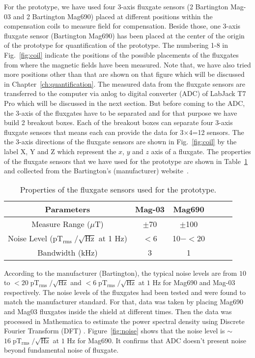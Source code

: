 For the prototype, we have used four 3-axis fluxgate sensors (2 Bartington Mag-03 and 2 Bartington Mag690) placed at different positions within the compensation coils to measure field for compensation. Beside those, one 3-axis fluxgate sensor (Bartington Mag690) has been placed at the center of the origin of the prototype for quantification of the prototype. The numbering 1-8 in Fig.~\ref{fig:coil} indicate the positions of the possible placements of the fluxgates from where the magnetic fields have been measured. Note that, we have also tried more positions other than that are shown on that figure which will be discussed in Chapter~\ref{ch:quantification}.  The measured data from the fluxgate sensors are transferred to the computer via anlog to digital converter (ADC) of LabJack T7 Pro which will be discussed in the next section. But before coming to the ADC, the 3-axis of the fluxgates have to be separated and for that purpose we have build  2 breakout boxes. Each of the breakout boxes can separate four 3-axis fluxgate sensors that means each can provide the data for 3$\times$4=12 sensors. The the 3-axis directions of the fluxgate sensors are shown in Fig.~\ref{fig:coil} by the label X, Y and Z which represent the $x$, $y$ and $z$ axis of a fluxgate.  The properties of the fluxgate sensors that we have used for the prototype are shown in Table~\ref{tablE:sensor} and collected from the Bartington's (manufacturer) website~\cite{flux}. 

\begin{table} [!htb]
    \centering
    \begin{tabular} { |c|c|c|c|c|c|} 
        \hline
        Parameters & Mag-03 & Mag690 \\
        \hline\hline
        Measure Range ($\mu$T) & $\pm$70 & $\pm$100 \\ 
        \hline
        \makecell{Noise Level \\($\mathrm{pT_{rms}\;/\sqrt{Hz}}$ at 1 Hz)} & $<$6 & 10$-<$20 \\ 
        \hline
        Bandwidth (kHz) & 3 & 1 \\ 
        \hline

    \end{tabular}
    \caption{Properties of the fluxgate sensors used for the prototype.}\label{tablE:sensor}
\end{table}

According to the manufacturer (Bartington), the typical noise levels are from $\mathrm{10}$ to $\mathrm{<20\;pT_{rms}\;/\sqrt{Hz}}$ and $\mathrm{<6 \; pT_{rms} \;/\sqrt{Hz}}$ at $\mathrm{1}$ Hz for Mag690 and Mag-03 respectively. The noise levels of the fluxgates had been tested  and were found to match the manufacturer standard. For that, data was taken by placing Mag690 and Mag03 fluxgates inside the shield at different times. Then the data was processed in Mathematica \cite{Mathematica} to estimate the power spectral density using Discrete Fourier Transform (DFT) \cite{dft}. Figure~\ref{fig:noise} shows that the noise level is $\sim$ $\mathrm{16\;pT_{rms}\;/\sqrt{Hz}}$ at $\mathrm{1}$ Hz for Mag690. It confirms that ADC doesn't present noise beyond fundamental noise of fluxgate.


